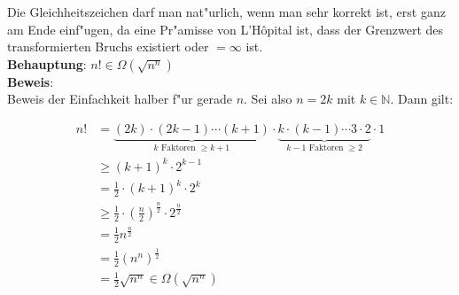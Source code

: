 \documentclass{scrartcl}
\begin{document}
Die Gleichheitszeichen darf man nat"urlich, wenn man sehr korrekt ist, erst ganz am Ende einf"ugen, da
eine Pr"amisse von L'H\^{o}pital ist, dass der Grenzwert des transformierten Bruchs existiert oder
$= \infty$ ist.
\\

\noindent\textbf{Behauptung}: $n! \in \Omega(\sqrt{n^n})$ \\
\textbf{Beweis}:   \\

Beweis der Einfachkeit halber f"ur gerade $n$. Sei also $n = 2k$ mit $k \in \mathbb{N}$. Dann gilt:

\begin{align*}
  n! &= \underbrace{(2k)\cdot(2k-1)\cdots(k+1)}_{k \text{ Faktoren } \geq k+1}\cdot \underbrace{k \cdot (k-1) \cdots 3 \cdot 2}_{k - 1 \text{ Faktoren } \geq 2} \cdot 1  \\
  &\geq (k+1)^k \cdot 2^{k-1} \\
  &= \frac{1}{2} \cdot (k+1)^k \cdot 2^k \\
  &\geq \frac{1}{2} \cdot \left(\frac{n}{2}\right)^{\frac{n}{2}} \cdot 2^{\frac{n}{2}} \\
  &= \frac{1}{2} n^{\frac{n}{2}} \\
  &= \frac{1}{2} \left(n^n\right)^{\frac{1}{2}} \\
  &= \frac{1}{2} \sqrt{n^n} \in \Omega(\sqrt{n^n})
\end{align*}
\end{document}
